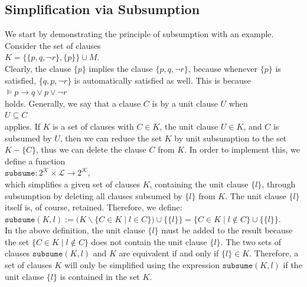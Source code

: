 \subsection{Simplification via Subsumption}
We start by demonstrating the principle of subsumption with an example.
Consider the set of clauses
\\[0.2cm]
\hspace*{1.3cm} $K = \bigl\{ \{p, q, \neg r\}, \{p\} \bigr\} \cup M$. \\[0.2cm]
Clearly, the clause $\{p\}$ implies the clause $\{p, q, \neg r\}$, because whenever
$\{p\}$ is satisfied, $\{q, p, \neg r\}$ is automatically satisfied as well. This is because
\\[0.2cm]
\hspace*{1.3cm} $\models p \rightarrow q \vee p \vee \neg r$
\\[0.2cm]
holds. Generally, we say that a clause $C$
is  by a unit clause $U$ when
\\[0.2cm]
\hspace*{1.3cm} $U \subseteq C$ \\[0.2cm]
applies. If $K$ is a set of clauses with $C \in K$, the unit clause $U \in K$, and
$C$ is subsumed by $U$, then we can reduce the set $K$ by unit subsumption to the set $K - \{ C \}$,
thus we can delete the clause $C$ from $K$.  In order to implement this, we define a function
\\[0.2cm]
\hspace*{1.3cm}
$\texttt{subsume}: 2^\mathcal{K} \times \mathcal{L} \rightarrow 2^\mathcal{K}$,
\\[0.2cm]
which simplifies a given set of clauses $K$, containing the unit clause $\{l\}$, through subsumption
by deleting all clauses subsumed by $\{l\}$ from $K$.
The unit clause $\{l\}$ itself is, of course, retained. Therefore, we define:
\\[0.2cm]
\hspace*{1.3cm}
$\texttt{subsume}(K, l) := 
\bigl(K \backslash \bigl\{ C \in K \mid l \in C \bigr\}\bigr) \cup \bigl\{\{l\}\bigr\} = 
\bigl\{ C \in K \mid l \not\in C \bigr\} \cup \bigl\{\{l\}\bigr\}$.
\\[0.2cm]
In the above definition, the unit clause $\{l\}$ must be added to the result because the set
\mbox{$\bigl\{ C \in K \mid l \not\in C \bigr\}$} does not contain the unit clause $\{l\}$. The two sets of clauses
$\mathtt{subsume}(K,l)$ and $K$ are equivalent if and only if $\{l\} \in K$.
Therefore, a set of clauses $K$ will only be simplified using the expression $\texttt{subsume}(K, l)$ if
the unit clause $\{l\}$ is contained in the set $K$.

